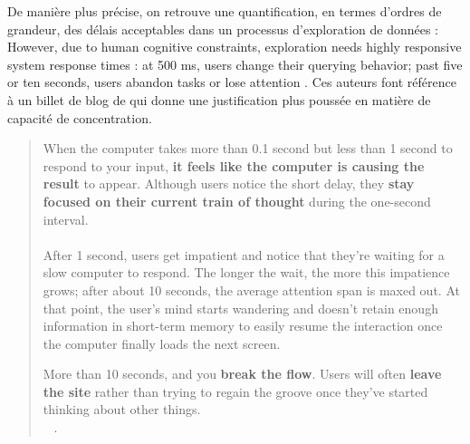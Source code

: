 De manière plus précise, on retrouve une quantification, en termes d'ordres de grandeur, des délais acceptables dans un processus d'exploration de données : 
\og However, due to human cognitive constraints, exploration needs highly responsive system response times \textelp{}: at 500 ms, users change their querying behavior; past five or ten seconds, users abandon tasks or lose attention\fg{} \autocite[2]{fekete2019progressive}.
Ces auteurs font référence à un billet de blog de  qui donne une justification plus poussée en matière de capacité de concentration.
\begin{quotation}
	\noindent\og
	When the computer takes more than 0.1 second but less than 1 second to respond to your input, \textbf{it feels like the computer is causing the result} to appear.
	Although users notice the short delay, they \textbf{stay focused on their current train of thought} during the one-second interval.\\
	\textelp{}\\
	After 1 second, users get impatient and notice that they're waiting for a slow computer to respond.
	The longer the wait, the more this impatience grows; after about 10 seconds, the average attention span is maxed out.
	At that point, the user's mind starts wandering and doesn't retain enough information in short-term memory to easily resume the interaction once the computer finally loads the next screen.
	
	More than 10 seconds, and you \textbf{break the flow}. Users will often \textbf{leave the site} rather than trying to regain the groove once they've started thinking about other things.
	\fg{}\\
	\mbox{}~ \hfill  \cite{nielsen_powers_2009}.
\end{quotation}


